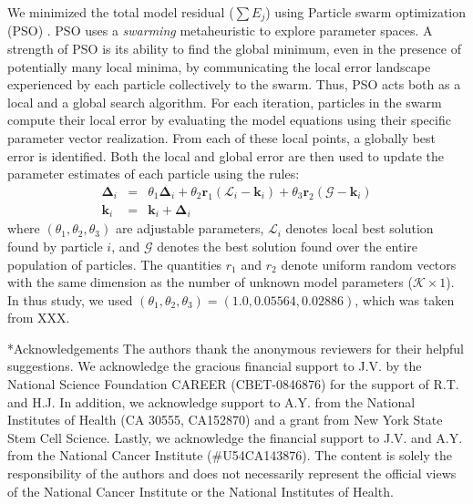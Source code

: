 \documentclass[12pt]{article}
\makeatletter
\renewcommand\section{\@startsection
	{subsection}{2}{0mm}
	{-0.2in}
	{0.05\baselineskip}
	{\normalfont\large\bfseries}}
\makeatother
\begin{document}
We minimized the total model residual ($\sum{E_{j}}$) using Particle swarm optimization (PSO) \citep{PSO}.
PSO uses a \textit{swarming} metaheuristic to explore parameter spaces. 
A strength of PSO is its ability to find the global minimum, even in the presence of potentially many local minima, by communicating the local
error landscape experienced by each particle collectively to the swarm. Thus, PSO acts both as a local and a global search algorithm. 
For each iteration, particles in the swarm compute their local error by evaluating the model equations using their specific parameter vector realization.
From each of these local points, a globally best error is identified. Both the local and global error 
are then used to update the parameter estimates of each particle using the rules:
\begin{eqnarray}
	\mathbf{\Delta}_{i} &=&\theta_{1}\mathbf{\Delta}_{i} + \theta_{2}\mathbf{r}_{1}\left(\mathcal{L}_{i} - \mathbf{k}_{i}\right) + \theta_{3}\mathbf{r}_{2}\left(\mathcal{G} - \mathbf{k}_{i}\right) \\
	\mathbf{k}_{i} &=& \mathbf{k}_{i} + \mathbf{\Delta}_{i}
\end{eqnarray}where $\left(\theta_{1},\theta_{2},\theta_{3}\right)$ are adjustable parameters, $\mathcal{L}_{i}$ denotes local best solution found by particle $i$, and
$\mathcal{G}$ denotes the best solution found over the entire population of particles. The quantities $r_{1}$ and $r_{2}$ denote uniform random vectors with the same dimension as the number of unknown model
parameters ($\mathcal{K}\times{1}$). In thus study, we used $\left(\theta_{1},\theta_{2},\theta_{3}\right) = \left(1.0, 0.05564, 0.02886\right)$, which was taken from XXX. 




\section*{Acknowledgements}
The authors thank the anonymous reviewers for their helpful suggestions. 
We acknowledge the gracious financial support to J.V. by the National Science Foundation CAREER (CBET-0846876) for the support of R.T. and H.J.
In addition, we acknowledge support to A.Y. from the National Institutes of Health (CA 30555, CA152870) 
and a grant from New York State Stem Cell Science.  Lastly, we acknowledge the financial support to J.V. and A.Y. 
from the National Cancer Institute (\#U54CA143876). The content is solely the responsibility of the authors and does not necessarily 
represent the official views of the National Cancer Institute or the National Institutes of Health.

\clearpage
%
%



\clearpage

\renewcommand\thefigure{S\arabic{figure}}
\renewcommand\thetable{T\arabic{table}}
\renewcommand\thepage{S-\arabic{page}}
\renewcommand\theequation{S\arabic{equation}}

\setcounter{equation}{0}
\setcounter{table}{0}
\setcounter{figure}{0}
\setcounter{page}{1}
\end{document}
